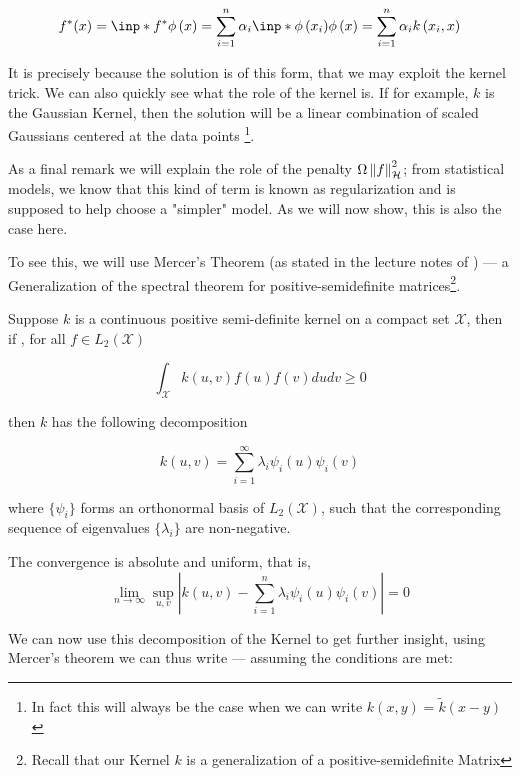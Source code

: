 $$
    f^{*}(x) = \inp*{f^{*}}{\phi\left(x\right)} = 
    \sum_{i=1}^{n} \alpha_{i} \inp*{\phi\left(x_i\right)}{\phi\left(x\right)} =
    \sum_{i=1}^{n} \alpha_{i} k\left(x_i, x\right)
$$

It is precisely because the solution is of this form, that we may exploit the kernel trick. We can
also quickly see what the role of the kernel is. If for example, $k$ is the Gaussian Kernel, then
the solution will be a linear combination of scaled Gaussians centered at the data points
\footnote{In fact this will always be the case when we can write $k\left(x, y\right) = \tilde{k}\left(x - y\right)$}. 

As a final remark we will explain the role of the penalty $\Omega \left\lVert f\right\rVert_{\mathcal{H}}^{2}$; from 
statistical models, we know that this kind of term is known as regularization and is supposed to help 
choose a "simpler" model. As we will now show, this is also the case here.

To see this, we will use Mercer's Theorem (as stated in the lecture notes of \cite{BartlettNotes}) --- a Generalization of the spectral theorem for positive-semidefinite
matrices\footnote{Recall that our Kernel $k$ is a generalization of a positive-semidefinite Matrix}.

\begin{theorem}[Mercer's] 

Suppose $k$ is a continuous positive semi-definite kernel on a compact set $\mathcal{X}$, then if
, for all $f \in L_{2}(\mathcal{X})$

\[
\int_{\mathcal{X}} k(u, v) f(u) f(v) d u d v \geq 0
\]

then $k$ has the following decomposition

\begin{equation}
    k(u, v)=\sum_{i=1}^{\infty} \lambda_{i} \psi_{i}(u) \psi_{i}(v)
\end{equation}

where $\{\psi_i\}$ forms an orthonormal basis of $L_2(\mathcal{X})$, 
such that the corresponding sequence of eigenvalues $\{\lambda_i\}$ are non-negative.

The convergence is absolute and uniform, that is,
\[
\lim _{n \rightarrow \infty} \sup _{u, v}\left|k(u, v)-\sum_{i=1}^{n} \lambda_{i} \psi_{i}(u) \psi_{i}(v)\right|=0
\]
    
\end{theorem}

We can now use this decomposition of the Kernel to get further insight, using Mercer's theorem we can 
thus write --- assuming the conditions are met:

